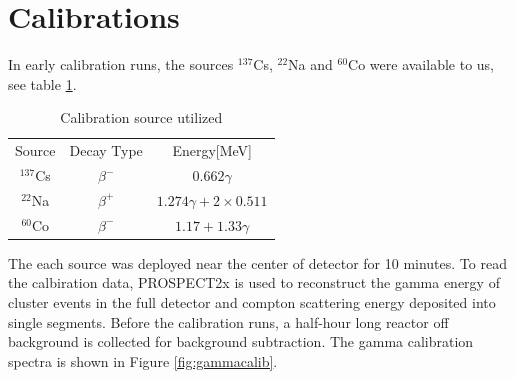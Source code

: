 \section{Calibrations}
In early calibration runs, the sources $^{137}$Cs, $^{22}$Na and $^{60}$Co were available to us, see table \ref{tab:src_table}.
\begin{table}
    \centering
    \begin{tabular}{c|c|c}
        Source & Decay Type & Energy[MeV]\\
        $^{137}$Cs  & $\beta^-$   & $0.662 \gamma$\\
        $^{22}$Na   & $\beta^+$   & $1.274 \gamma + 2\times0.511$ \\
        $^{60}$Co   & $\beta^-$   & $1.17 + 1.33 \gamma$
    \end{tabular}
    \caption{Calibration source utilized}
    \label{tab:src_table}
\end{table}

The each source was deployed near the center of detector for 10 minutes. To read the calbiration data, PROSPECT2x is used to reconstruct the gamma energy of cluster events in the full detector and compton scattering energy deposited into single segments. Before the calibration runs, a half-hour long reactor off background is collected for background subtraction. The gamma calibration spectra is shown in Figure \ref{fig:gammacalib}.


